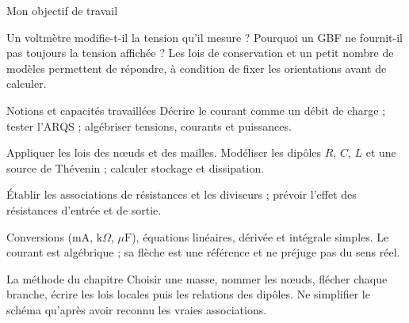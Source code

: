 \thispagestyle{mpsiFront}
\begin{docu}{Mon objectif de travail}\end{docu}

Un voltmètre modifie-t-il la tension qu’il mesure ? Pourquoi un GBF ne fournit-il pas toujours la tension affichée ? Les lois de conservation et un petit nombre de modèles permettent de répondre, à condition de fixer les orientations avant de calculer.
\begin{loi}{Notions et capacités travaillées}
Décrire le courant comme un débit de charge ; tester l’ARQS ; algébriser tensions, courants et puissances.\par Appliquer les lois des nœuds et des mailles. Modéliser les dipôles $R$, $C$, $L$ et une source de Thévenin ; calculer stockage et dissipation.\par Établir les associations de résistances et les diviseurs ; prévoir l’effet des résistances d’entrée et de sortie.
\end{loi}

Conversions ($\mathrm{mA}$, $\mathrm{k}\Omega$, $\mu\mathrm{ F}$), équations linéaires, dérivée et intégrale simples. Le courant est algébrique ; sa flèche est une référence et ne préjuge pas du sens réel.

\begin{methode}{La méthode du chapitre}
Choisir une masse, nommer les nœuds, flécher chaque branche, écrire les lois locales puis les relations des dipôles. Ne simplifier le schéma qu’après avoir reconnu les vraies associations.
\end{methode}

